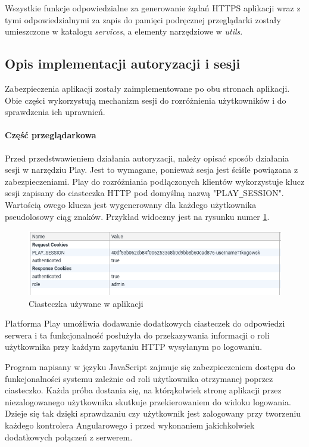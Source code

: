 \documentclass[a4paper,12pt,twoside]{article}
\begin{document}
Wszystkie funkcje odpowiedzialne za generowanie
żądań HTTPS aplikacji wraz z tymi odpowiedzialnymi
za zapis do pamięci podręcznej przeglądarki zostały umieszczone w 
katalogu \textit{services}, a elementy narzędziowe w \textit{utils}.

\subsection{Opis implementacji autoryzacji i sesji}

Zabezpieczenia aplikacji zostały zaimplementowane po obu stronach aplikacji.
Obie części wykorzystują mechanizm sesji do rozróżnienia użytkowników
i do sprawdzenia ich uprawnień.

\paragraph{Część przeglądarkowa}
Przed przedstwawieniem działania autoryzacji, należy opisać 
sposób działania sesji w narzędziu Play. Jest to wymagane, ponieważ 
sesja jest ściśle powiązana z zabezpieczeniami.
Play do rozróżniania podłączonych klientów wykorzystuje  klucz sesji zapisany do
ciasteczka HTTP pod domyślną nazwą "PLAY\verb!_!SESSION".   
Wartością owego klucza jest wygenerowany dla każdego użytkownika pseudolosowy ciąg znaków. Przykład widoczny jest na rysunku numer \ref{fig:cookiespic}.
 
\begin{figure}[h]
\includegraphics[width=\linewidth]{obrazy/aplikacja/cookies.png}
\caption{Ciasteczka używane w aplikacji}
\label{fig:cookiespic}
\end{figure}
\newpage

Platforma Play umożliwia dodawanie dodatkowych ciasteczek do odpowiedzi serwera
i ta funkcjonalność posłużyła do przekazywania informacji o roli użytkownika przy każdym zapytaniu HTTP wysyłanym po logowaniu.  

Program napisany w języku JavaScript zajmuje się zabezpieczeniem
dostępu do funkcjonalności systemu zależnie od roli użytkownika otrzymanej 
poprzez ciasteczko. 
Każda próba dostania się, na którąkolwiek stronę aplikacji przez niezalogowanego użytkownika skutkuje przekierowaniem do widoku logowania. 
Dzieje się tak dzięki sprawdzaniu czy użytkownik jest zalogowany przy tworzeniu każdego kontrolera Angularowego i przed 
wykonaniem jakichkolwiek dodatkowych połączeń z serwerem.
\end{document}
